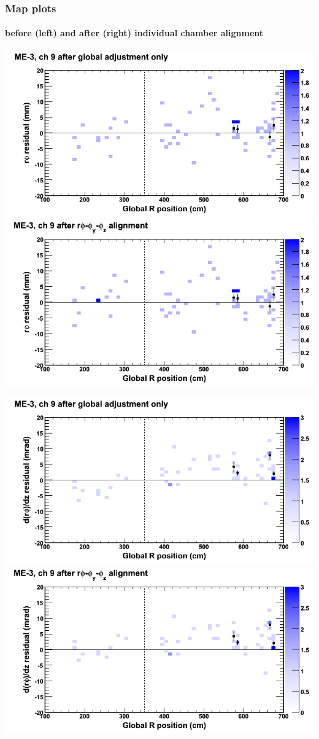 \documentclass[compress]{beamer}
\begin{document}
\begin{frame}
\frametitle{Map plots}
\framesubtitle{before (left) and after (right) individual chamber alignment}
\includegraphics[width=0.5\linewidth]{ringmapplots_3dof/before_CSCvsr_mem3ch09_x.png} \includegraphics[width=0.5\linewidth]{ringmapplots_3dof/after_CSCvsr_mem3ch09_x.png}

\includegraphics[width=0.5\linewidth]{ringmapplots_3dof/before_CSCvsr_mem3ch09_dxdz.png} \includegraphics[width=0.5\linewidth]{ringmapplots_3dof/after_CSCvsr_mem3ch09_dxdz.png}
\end{frame}
\end{document}
